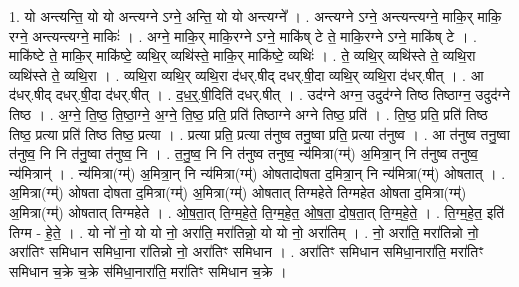 \documentclass[17pt]{extarticle}
\begin{document}
1. यो अन्त्यन्ति॒ यो यो अन्त्यग्ने ऽग्ने॒ अन्ति॒ यो यो अन्त्यग्ने᳚ । . अन्त्यग्ने ऽग्ने॒ अन्त्यन्त्यग्ने॒ माकि॒र् माकि॒ रग्ने॒ अन्त्यन्त्यग्ने॒ माकिः॑ । . अग्ने॒ माकि॒र् माकि॒रग्ने ऽग्ने॒ माकि॑ष् टे ते॒ माकि॒रग्ने ऽग्ने॒ माकि॑ष् टे । . माकि॑ष्टे ते॒ माकि॒र् माकि॑ष्टे॒ व्यथि॒र् व्यथि॑स्ते॒ माकि॒र् माकि॑ष्टे॒ व्यथिः॑ । . ते॒ व्यथि॒र् व्यथि॑स्ते ते॒ व्यथि॒रा व्यथि॑स्ते ते॒ व्यथि॒रा । . व्यथि॒रा व्यथि॒र् व्यथि॒रा द॑धर्.षीद् दधर्.षी॒दा व्यथि॒र् व्यथि॒रा द॑धर्.षीत् । . आ द॑धर्.षीद् दधर्.षी॒दा द॑धर्.षीत् । . द॒ध॒र्॒.षी॒दिति॑ दधर्.षीत् । . उद॑ग्ने अग्न॒ उदुद॑ग्ने तिष्ठ तिष्ठाग्न॒ उदुद॑ग्ने तिष्ठ । . अ॒ग्ने॒ ति॒ष्ठ॒ ति॒ष्ठा॒ग्ने॒ अ॒ग्ने॒ ति॒ष्ठ॒ प्रति॒ प्रति॑ तिष्ठाग्ने अग्ने तिष्ठ॒ प्रति॑ । . ति॒ष्ठ॒ प्रति॒ प्रति॑ तिष्ठ तिष्ठ॒ प्रत्या प्रति॑ तिष्ठ तिष्ठ॒ प्रत्या । . प्रत्या प्रति॒ प्रत्या त॑नुष्व तनु॒ष्वा प्रति॒ प्रत्या त॑नुष्व । . आ त॑नुष्व तनु॒ष्वा त॑नुष्व॒ नि नि त॑नु॒ष्वा त॑नुष्व॒ नि । . त॒नु॒ष्व॒ नि नि त॑नुष्व तनुष्व॒ न्य॑मित्रा(ग्म्॑) अ॒मित्रा॒न् नि त॑नुष्व तनुष्व॒ न्य॑मित्रान्॑ । . न्य॑मित्रा(ग्म्॑) अ॒मित्रा॒न् नि न्य॑मित्रा(ग्म्॑) ओषतादोषता द॒मित्रा॒न् नि न्य॑मित्रा(ग्म्॑) ओषतात् । . अ॒मित्रा(ग्म्॑) ओषता दोषता द॒मित्रा(ग्म्॑) अ॒मित्रा(ग्म्॑) ओषतात् तिग्महेते तिग्महेत ओषता द॒मित्रा(ग्म्॑) अ॒मित्रा(ग्म्॑) ओषतात् तिग्महेते । . ओ॒ष॒ता॒त् ति॒ग्म॒हे॒ते॒ ति॒ग्म॒हे॒त॒ ओ॒ष॒ता॒ दो॒ष॒ता॒त् ति॒ग्म॒हे॒ते॒ । . ति॒ग्म॒हे॒त॒ इति॑ तिग्म - हे॒ते॒ । . यो नो॑ नो॒ यो यो नो॒ अरा॑ति॒ मरा॑तिन्नो॒ यो यो नो॒ अरा॑तिम् । . नो॒ अरा॑ति॒ मरा॑तिन्नो नो॒ अरा॑तिꣳ समिधान समिधा॒ना रा॑तिन्नो नो॒ अरा॑तिꣳ समिधान । . अरा॑तिꣳ समिधान समिधा॒नारा॑ति॒ मरा॑तिꣳ समिधान च॒क्रे च॒क्रे स॑मिधा॒नारा॑ति॒ मरा॑तिꣳ समिधान च॒क्रे । \newline
\end{document}

